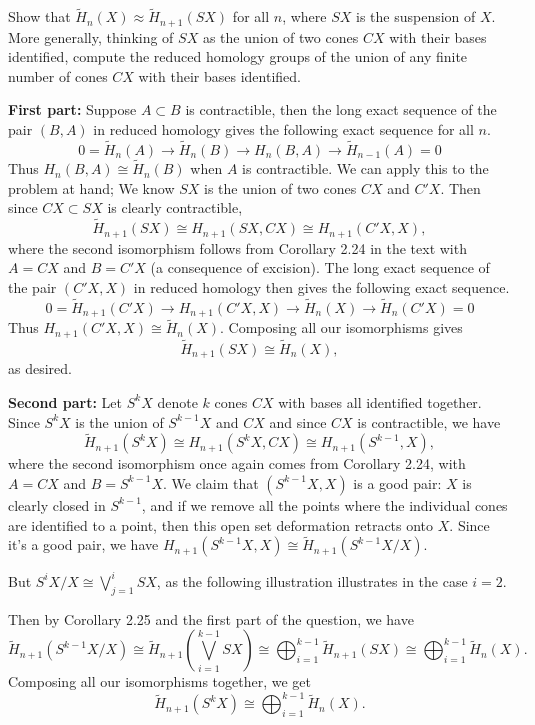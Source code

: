 \documentclass[twoside,10pt]{article}
\begin{document}

\begin{exer}[2.1: 20]
	Show that $\tilde{H}_{n}(X) \approx \tilde{H}_{n+1}(SX)$ for all $n$, where $SX$ is the suspension of $X$. More generally, thinking of $SX$ as the union of two cones $CX$ with their bases identified, compute the reduced homology groups of the union of any finite number of cones $CX$ with their bases identified.
\end{exer}

\textbf{First part:} Suppose $A \subset B$ is contractible, then the long exact sequence of the pair $(B,A)$ in reduced homology gives the following exact sequence for all $n$.
\[
	0 = \tilde{H}_{n}(A) \to \tilde{H}_{n}(B) \to H_{n}(B,A) \to \tilde{H}_{n-1}(A) = 0
\] Thus $H_{n}(B,A) \cong \tilde{H}_{n}(B)$ when $A$ is contractible. We can apply this to the problem at hand; We know $SX$ is the union of two cones $CX$ and $C'X$. Then since $CX \subset SX$ is clearly contractible,
\[
	\tilde{H}_{n+1}(SX) \cong H_{n+1}(SX,CX) \cong H_{n+1}(C'X,X),
\]
where the second isomorphism follows from Corollary 2.24 in the text with $A=CX$ and $B=C'X$ (a consequence of excision). The long exact sequence of the pair $(C'X,X)$ in reduced homology then gives the following exact sequence.
\[
	0=\tilde{H}_{n+1}(C'X) \to H_{n+1}(C'X,X) \to \tilde{H}_{n}(X) \to \tilde{H}_{n}(C'X) = 0
\] Thus $H_{n+1}(C'X,X) \cong \tilde{H}_{n}(X)$. Composing all our isomorphisms gives
\[
	\tilde{H}_{n+1}(SX) \cong \tilde{H}_{n}(X),
\] as desired.

\textbf{Second part:} Let $S^{k}X$ denote $k$ cones $CX$ with bases all identified together. Since $S^{k}X$ is the union of $S^{k-1}X$ and $CX$ and since $CX$ is contractible, we have
\[
	\tilde{H}_{n+1}(S^{k}X) \cong H_{n+1}(S^{k}X,CX) \cong H_{n+1}(S^{k-1},X),
\] where the second isomorphism once again comes from Corollary 2.24, with $A=CX$ and $B=S^{k-1}X$. We claim that $(S^{k-1}X,X)$ is a good pair: $X$ is clearly closed in $S^{k-1}$, and if we remove all the points where the individual cones are identified to a point, then this open set deformation retracts onto $X$. Since it's a good pair, we have $H_{n+1}(S^{k-1}X,X) \cong \tilde{H}_{n+1}(S^{k-1}X/X)$.

But $S^{i}X/X \cong \bigvee_{j=1}^{i} SX$, as the following illustration illustrates in the case $i=2$.

\newpage

Then by Corollary 2.25 and the first part of the question, we have
\[
	\tilde{H}_{n+1}(S^{k-1}X/X) \cong \tilde{H}_{n+1}\left(\bigvee_{i=1}^{k-1} SX \right) \cong \bigoplus_{i=1}^{k-1} \tilde{H}_{n+1}(SX) \cong \bigoplus_{i=1}^{k-1} \tilde{H}_{n}(X).
\] 
Composing all our isomorphisms together, we get
\[
	\tilde{H}_{n+1}(S^{k}X) \cong \bigoplus_{i=1}^{k-1} \tilde{H}_{n}(X).
\] 
\end{document}
